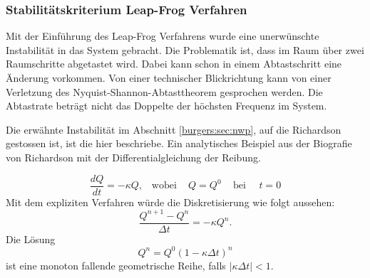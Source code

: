 \subsubsection{Stabilit\"atskriterium Leap-Frog Verfahren}
	Mit der Einf\"uhrung des Leap-Frog Verfahrens wurde eine unerw\"unschte Instabilit\"at in das System gebracht.
	Die Problematik ist, dass im Raum über zwei Raumschritte abgetastet wird.
	Dabei kann schon in einem Abtastschritt eine Änderung vorkommen.
	Von einer technischer Blickrichtung kann von einer Verletzung des Nyquist-Shannon-Abtasttheorem gesprochen werden.
	Die Abtastrate beträgt nicht das Doppelte der höchsten Frequenz im System.

	\medskip

	Die erw\"ahnte Instabilit\"at im Abschnitt \ref{burgers:sec:nwp}, auf die Richardson gestossen ist, ist die hier beschriebe.
	Ein analytisches Beispiel aus der Biografie von Richardson \cite{burgers:lynch_2014} mit der Differentialgleichung der Reibung.

	\begin{equation}
		\frac{dQ}{dt} = - \kappa Q, \,\,\,\,\, \text{wobei} \, \,\,\,\,\,\, Q=Q^0 \,\,\,\,\,\,\, \text{bei} \,\,\,\,\,\,\,\, t=0
	\end{equation}
	Mit dem expliziten Verfahren w\"urde die Diskretisierung wie folgt aussehen:
	\begin{equation}
		\frac{Q^{n+1}-Q^n}{\Delta t} = - \kappa Q^n.
	\end{equation}
	Die L\"osung
		\begin{equation}
			Q^n = Q^0(1-\kappa \Delta t)^n
		\end{equation}
	ist eine monoton fallende geometrische Reihe, falls $|\kappa \Delta t| <1$.

